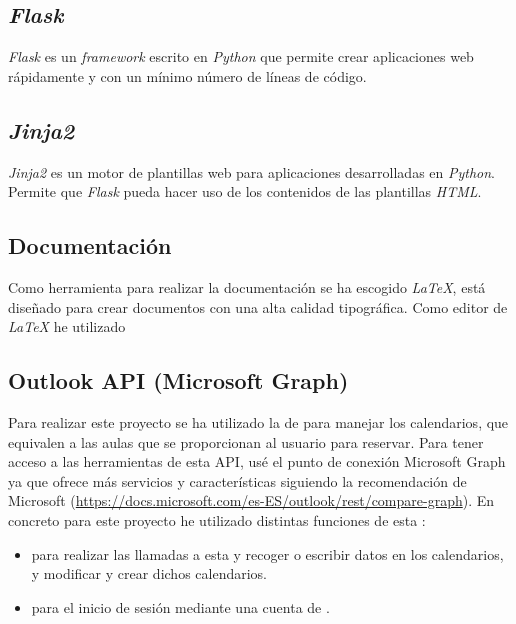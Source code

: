\subsection{\textit{Flask}}
\textit{Flask} es un \textit{framework} escrito en \textit{Python} que permite crear aplicaciones web rápidamente y con un mínimo número de líneas de código.

\subsection{\textit{Jinja2}}
\textit{Jinja2} es un motor de plantillas web para aplicaciones desarrolladas en \textit{Python}. Permite que \textit{Flask} pueda hacer uso de los contenidos de las plantillas \textit{HTML}.

\subsection{Documentación}
Como herramienta para realizar la documentación se ha escogido \textit{LaTeX}, está diseñado para crear documentos con una alta calidad tipográfica. Como editor de \textit{LaTeX} he utilizado 

\subsection{Outlook API (Microsoft Graph) }
Para realizar este proyecto se ha utilizado la  de  para manejar los calendarios, que equivalen a las aulas que se proporcionan al usuario para reservar. Para tener acceso a las herramientas de esta API, usé el punto de conexión Microsoft Graph ya que ofrece más servicios y características siguiendo la recomendación de Microsoft (\url{https://docs.microsoft.com/es-ES/outlook/rest/compare-graph}).
En concreto para este proyecto he utilizado distintas funciones de esta :
\begin{itemize}
    \item {} para realizar las llamadas a esta  y recoger o escribir datos en los calendarios, y modificar y crear dichos calendarios.
    \item {} para el inicio de sesión mediante una cuenta de .
\end{itemize}
